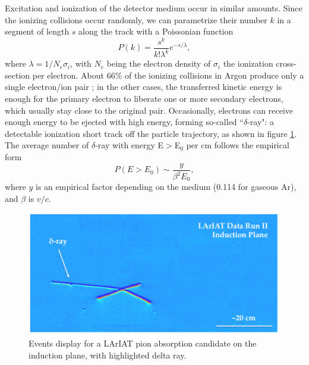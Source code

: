 Excitation and ionization of the detector medium occur in similar amounts. Since the ionizing collisions occur randomly, we can parametrize their number $k$ in a segment of length $s$ along the track  with a Poissonian function
\begin{equation}
P(k) = \frac{s^k}{k! \lambda^k} e^{-s/ \lambda }, 
\end{equation}
where $\lambda = 1/N_{e}\sigma_i$, with $N_{e}$ being the electron density of $\sigma_i$ the ionization cross-section per electron.  About 66\% of the ionizing collisions in Argon produce only a single electron/ion pair \cite{0034-4885-73-11-116201}; in the other cases, the transferred kinetic energy is enough for the primary electron to liberate one or more secondary electrons, which usually stay close to the original pair.  
Occasionally, electrons can receive enough energy to be ejected with high energy, forming so-called ``$\delta$-ray": a detectable ionization short track off the particle trajectory, as shown in figure \ref{fig:delta}. 
The average number of $\delta$-ray  with energy E$>$E$_0$ per cm follows the empirical form
\begin{equation}
P(E>E_0) \sim \frac{y}{\beta^2 E_0},
\end{equation}
where $y$ is an empirical factor depending on the medium (0.114 for  gaseous Ar), and $\beta$ is $v/c$.

\begin{figure}[hbpt]
\centering
\includegraphics[width=\textwidth]{Chapter-2/Images/Delta.png}
\caption{Events display for a LArIAT pion absorption candidate on the induction plane, with highlighted delta ray.}
\label{fig:delta}
\end{figure}


		
